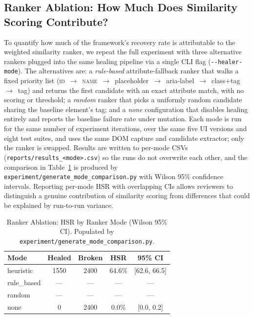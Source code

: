 \documentclass[conference]{IEEEtran}
\begin{document}
\subsection{Ranker Ablation: How Much Does Similarity Scoring Contribute?}
\label{sec:ablation}
To quantify how much of the framework's recovery rate is attributable to the weighted similarity ranker, we repeat the full experiment with three alternative rankers plugged into the same healing pipeline via a single CLI flag (\texttt{-{}-healer-mode}). The alternatives are: a \emph{rule-based} attribute-fallback ranker that walks a fixed priority list (\textsc{id}~$\to$~\textsc{name}~$\to$~placeholder~$\to$~aria-label~$\to$~class+tag~$\to$~tag) and returns the first candidate with an exact attribute match, with no scoring or threshold; a \emph{random} ranker that picks a uniformly random candidate sharing the baseline element's tag; and a \emph{none} configuration that disables healing entirely and reports the baseline failure rate under mutation. Each mode is run for the same number of experiment iterations, over the same five UI versions and eight test suites, and uses the same DOM capture and candidate extractor; only the ranker is swapped. Results are written to per-mode CSVs (\texttt{reports/results\_<mode>.csv}) so the runs do not overwrite each other, and the comparison in Table~\ref{tab:mode_comparison} is produced by \texttt{experiment/generate\_mode\_comparison.py} with Wilson 95\% confidence intervals. Reporting per-mode HSR with overlapping CIs allows reviewers to distinguish a genuine contribution of similarity scoring from differences that could be explained by run-to-run variance.

\begin{table}[H]
\centering
\caption{Ranker Ablation: HSR by Ranker Mode (Wilson 95\% CI). Populated by \texttt{experiment/generate\_mode\_comparison.py}.}
\label{tab:mode_comparison}
\begin{tabular}{lcccc}
\toprule
Mode & Healed & Broken & HSR & 95\% CI \\
\midrule
heuristic   & 1550 & 2400 & 64.6\% & [62.6, 66.5] \\
rule\_based & ---  & ---  & ---    & --- \\
random      & ---  & ---  & ---    & --- \\
none        & 0    & 2400 & 0.0\%  & [0.0, 0.2] \\
\bottomrule
\end{tabular}
\end{table}
\end{document}
